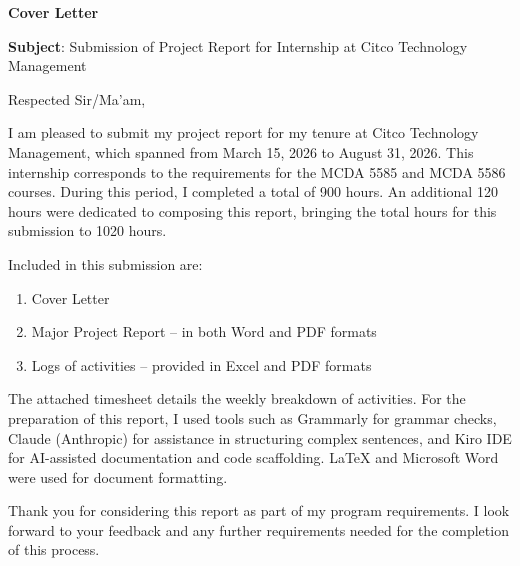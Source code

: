 \documentclass[12pt,oneside,letterpaper]{article}
\begin{document}
\thispagestyle{empty}

\begin{center}
{\fontsize{20}{24}\selectfont\textbf{\textcolor{smubrand}{Cover Letter}}}
\end{center}

\vspace{0.5cm}

\textbf{Subject}: Submission of Project Report for Internship at Citco Technology Management

\vspace{0.3cm}

Respected Sir/Ma'am,

\vspace{0.3cm}

I am pleased to submit my project report for my tenure at Citco Technology Management, which spanned from March 15, 2026 to August 31, 2026. This internship corresponds to the requirements for the MCDA 5585 and MCDA 5586 courses. During this period, I completed a total of 900 hours. An additional 120 hours were dedicated to composing this report, bringing the total hours for this submission to 1020 hours.

\vspace{0.3cm}

Included in this submission are:
\begin{enumerate}
    \item Cover Letter
    \item Major Project Report -- in both Word and PDF formats
    \item Logs of activities -- provided in Excel and PDF formats
\end{enumerate}

\vspace{0.3cm}

The attached timesheet details the weekly breakdown of activities. For the preparation of this report, I used tools such as Grammarly for grammar checks, Claude (Anthropic) for assistance in structuring complex sentences, and Kiro IDE for AI-assisted documentation and code scaffolding. LaTeX and Microsoft Word were used for document formatting.

\vspace{0.3cm}

Thank you for considering this report as part of my program requirements. I look forward to your feedback and any further requirements needed for the completion of this process.

\vspace{0.5cm}
\end{document}
